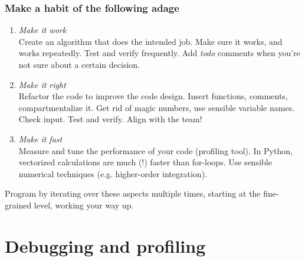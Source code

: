 \begin{frame}[fragile,label=wrf-explain]
  \frametitle{Make a habit of the following adage}
  \begin{enumerate}
     \item \emph{Make it work}\\ 
    Create an algorithm that does the intended job. Make sure it works, and works repeatedly. Test and verify frequently. Add \emph{todo} comments when you're not sure about a certain decision.
     \item \emph{Make it right}\\ 
    Refactor the code to improve the code design. Insert functions, comments, compartmentalize it. Get rid of magic numbers, use sensible variable names. Check input. Test and verify. Align with the team!
     \item \emph{Make it fast}\\ 
    Measure and tune the performance of your code (profiling tool). In Python, vectorized calculations are much (!) faster than for-loops. Use sensible numerical techniques (e.g. higher-order integration).
  \end{enumerate}
  Program by iterating over these aspects multiple times, starting at the fine-grained level, working your way up.
\end{frame}


\section{Debugging and profiling}
